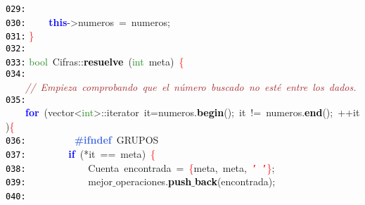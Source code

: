 \documentclass[a4paper,10pt]{scrartcl}
\begin{document}
{   \mbox{}\texttt{\textcolor{Black}{029:}} \ \  \\
   \mbox{}\texttt{\textcolor{Black}{030:}} \ \ \ \ \textbf{\textcolor{Blue}{this}}\textcolor{BrickRed}{-\textgreater{}}numeros\ \textcolor{BrickRed}{=}\ numeros\textcolor{BrickRed}{;} \\
   \mbox{}\texttt{\textcolor{Black}{031:}} \textcolor{Red}{\}} \\
   \mbox{}\texttt{\textcolor{Black}{032:}}  \\
   \mbox{}\texttt{\textcolor{Black}{033:}} \textcolor{ForestGreen}{bool}\ Cifras\textcolor{BrickRed}{::}\textbf{\textcolor{Black}{resuelve}}\ \textcolor{BrickRed}{(}\textcolor{ForestGreen}{int}\ meta\textcolor{BrickRed}{)}\ \textcolor{Red}{\{} \\
   \mbox{}\texttt{\textcolor{Black}{034:}} \ \ \ \ \textit{\textcolor{Brown}{//\ Empieza\ comprobando\ que\ el\ número\ buscado\ no\ esté\ entre\ los\ dados.}} \\
   \mbox{}\texttt{\textcolor{Black}{035:}} \ \ \ \ \textbf{\textcolor{Blue}{for}}\ \textcolor{BrickRed}{(}vector\textcolor{BrickRed}{\textless{}}\textcolor{ForestGreen}{int}\textcolor{BrickRed}{\textgreater{}::}\textcolor{TealBlue}{iterator}\ it\textcolor{BrickRed}{=}numeros\textcolor{BrickRed}{.}\textbf{\textcolor{Black}{begin}}\textcolor{BrickRed}{();}\ it\ \textcolor{BrickRed}{!=}\ numeros\textcolor{BrickRed}{.}\textbf{\textcolor{Black}{end}}\textcolor{BrickRed}{();}\ \textcolor{BrickRed}{++}it\textcolor{BrickRed}{)}\textcolor{Red}{\{} \\
   \mbox{}\texttt{\textcolor{Black}{036:}} \textbf{\textcolor{RoyalBlue}{\ \ \ \ \ \ \ \ \#ifndef}}\ GRUPOS \\
   \mbox{}\texttt{\textcolor{Black}{037:}} \ \ \ \ \ \ \ \ \textbf{\textcolor{Blue}{if}}\ \textcolor{BrickRed}{(*}it\ \textcolor{BrickRed}{==}\ meta\textcolor{BrickRed}{)}\ \textcolor{Red}{\{} \\
   \mbox{}\texttt{\textcolor{Black}{038:}} \ \ \ \ \ \ \ \ \ \ \ \ \textcolor{TealBlue}{Cuenta}\ encontrada\ \textcolor{BrickRed}{=}\ \textcolor{Red}{\{}meta\textcolor{BrickRed}{,}\ meta\textcolor{BrickRed}{,}\ \texttt{\textcolor{Red}{'\ '}}\textcolor{Red}{\}}\textcolor{BrickRed}{;} \\
   \mbox{}\texttt{\textcolor{Black}{039:}} \ \ \ \ \ \ \ \ \ \ \ \ mejor$\_$operaciones\textcolor{BrickRed}{.}\textbf{\textcolor{Black}{push$\_$back}}\textcolor{BrickRed}{(}encontrada\textcolor{BrickRed}{);} \\
   \mbox{}\texttt{\textcolor{Black}{040:}} \ \ \ \ \ \ \ \ \ \ \ \  \\
}
\end{document}
